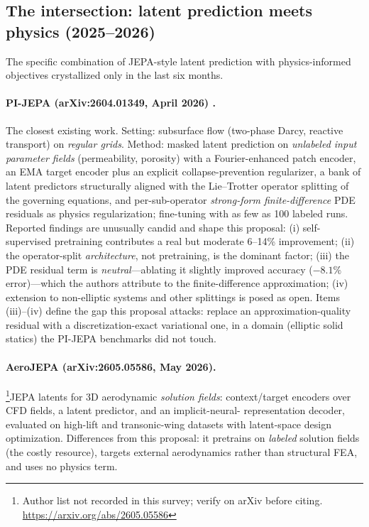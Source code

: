 \documentclass[11pt]{article}
\begin{document}
\subsection{The intersection: latent prediction meets physics (2025--2026)}
\label{sec:intersection}

The specific combination of JEPA-style latent prediction with
physics-informed objectives crystallized only in the last six months.

\paragraph{PI-JEPA (arXiv:2604.01349, April 2026) \cite{yee2026pijepa}.}
The closest existing work. Setting: subsurface flow (two-phase Darcy,
reactive transport) on \emph{regular grids}. Method: masked latent prediction
on \emph{unlabeled input parameter fields} (permeability, porosity) with a
Fourier-enhanced patch encoder, an EMA target encoder plus an explicit
collapse-prevention regularizer, a bank of latent predictors structurally
aligned with the Lie--Trotter operator splitting of the governing equations,
and per-sub-operator \emph{strong-form finite-difference} PDE residuals as
physics regularization; fine-tuning with as few as 100 labeled runs. Reported
findings are unusually candid and shape this proposal: (i) self-supervised
pretraining contributes a real but moderate 6--14\% improvement; (ii) the
operator-split \emph{architecture}, not pretraining, is the dominant factor;
(iii) the PDE residual term is \emph{neutral}---ablating it slightly improved
accuracy ($-8.1\%$ error)---which the authors attribute to the
finite-difference approximation; (iv) extension to non-elliptic systems and
other splittings is posed as open. Items (iii)--(iv) define the gap this
proposal attacks: replace an approximation-quality residual with a
discretization-exact variational one, in a domain (elliptic solid statics)
the PI-JEPA benchmarks did not touch.

\paragraph{AeroJEPA (arXiv:2605.05586, May 2026).}
\footnote{Author list not recorded in this survey; verify on arXiv before
citing. \url{https://arxiv.org/abs/2605.05586}}JEPA latents for 3D aerodynamic \emph{solution fields}: context/target
encoders over CFD fields, a latent predictor, and an implicit-neural-
representation decoder, evaluated on high-lift and transonic-wing datasets
with latent-space design optimization. Differences from this proposal: it
pretrains on \emph{labeled} solution fields (the costly resource), targets
external aerodynamics rather than structural FEA, and uses no physics term.
\end{document}
